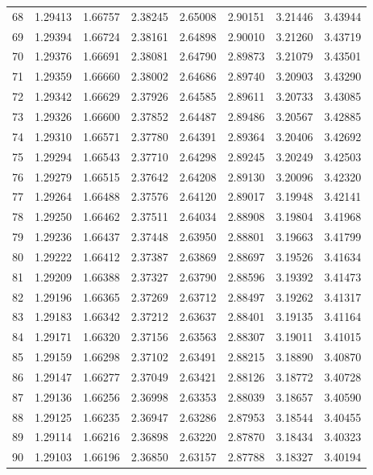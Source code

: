 \begin{tabular}{lrrrrrrr}
68 & 1.29413 & 1.66757 & 2.38245 & 2.65008 & 2.90151 & 3.21446 & 3.43944 \\
69 & 1.29394 & 1.66724 & 2.38161 & 2.64898 & 2.90010 & 3.21260 & 3.43719 \\
70 & 1.29376 & 1.66691 & 2.38081 & 2.64790 & 2.89873 & 3.21079 & 3.43501 \\
71 & 1.29359 & 1.66660 & 2.38002 & 2.64686 & 2.89740 & 3.20903 & 3.43290 \\
72 & 1.29342 & 1.66629 & 2.37926 & 2.64585 & 2.89611 & 3.20733 & 3.43085 \\
73 & 1.29326 & 1.66600 & 2.37852 & 2.64487 & 2.89486 & 3.20567 & 3.42885 \\
74 & 1.29310 & 1.66571 & 2.37780 & 2.64391 & 2.89364 & 3.20406 & 3.42692 \\
75 & 1.29294 & 1.66543 & 2.37710 & 2.64298 & 2.89245 & 3.20249 & 3.42503 \\
76 & 1.29279 & 1.66515 & 2.37642 & 2.64208 & 2.89130 & 3.20096 & 3.42320 \\
77 & 1.29264 & 1.66488 & 2.37576 & 2.64120 & 2.89017 & 3.19948 & 3.42141 \\
78 & 1.29250 & 1.66462 & 2.37511 & 2.64034 & 2.88908 & 3.19804 & 3.41968 \\
79 & 1.29236 & 1.66437 & 2.37448 & 2.63950 & 2.88801 & 3.19663 & 3.41799 \\
80 & 1.29222 & 1.66412 & 2.37387 & 2.63869 & 2.88697 & 3.19526 & 3.41634 \\
81 & 1.29209 & 1.66388 & 2.37327 & 2.63790 & 2.88596 & 3.19392 & 3.41473 \\
82 & 1.29196 & 1.66365 & 2.37269 & 2.63712 & 2.88497 & 3.19262 & 3.41317 \\
83 & 1.29183 & 1.66342 & 2.37212 & 2.63637 & 2.88401 & 3.19135 & 3.41164 \\
84 & 1.29171 & 1.66320 & 2.37156 & 2.63563 & 2.88307 & 3.19011 & 3.41015 \\
85 & 1.29159 & 1.66298 & 2.37102 & 2.63491 & 2.88215 & 3.18890 & 3.40870 \\
86 & 1.29147 & 1.66277 & 2.37049 & 2.63421 & 2.88126 & 3.18772 & 3.40728 \\
87 & 1.29136 & 1.66256 & 2.36998 & 2.63353 & 2.88039 & 3.18657 & 3.40590 \\
88 & 1.29125 & 1.66235 & 2.36947 & 2.63286 & 2.87953 & 3.18544 & 3.40455 \\
89 & 1.29114 & 1.66216 & 2.36898 & 2.63220 & 2.87870 & 3.18434 & 3.40323 \\
90 & 1.29103 & 1.66196 & 2.36850 & 2.63157 & 2.87788 & 3.18327 & 3.40194 \\

\end{tabular}
